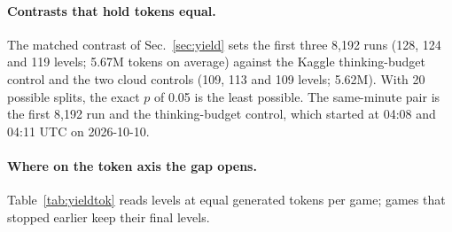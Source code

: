 \paragraph{Contrasts that hold tokens equal.}
The matched contrast of Sec.~\ref{sec:yield} sets the first three 8,192 runs (128, 124 and 119 levels; 5.67M tokens on average) against the Kaggle thinking-budget control and the two cloud controls (109, 113 and 109 levels; 5.62M). %
With 20 possible splits, the exact $p$ of 0.05 is the least possible. %
The same-minute pair is the first 8,192 run and the thinking-budget control, which started at 04:08 and 04:11 UTC on 2026-10-10. %

\paragraph{Where on the token axis the gap opens.}
Table~\ref{tab:yieldtok} reads levels at equal generated tokens per game; games that stopped earlier keep their final levels.

\begin{table}[!htb]
\caption{Levels at equal generated tokens per game: yield 8,192 minus the 21 controls (higher is better). The later seven include the own-traffic draft-vocabulary run. Nine horizons were computed. The first two lead at 100K ($p=0.016$) and 150K ($p=0.028$, exact one-sided), the only horizons where we computed it.}\label{tab:yieldtok}
\centering\footnotesize
{}
\end{table}

